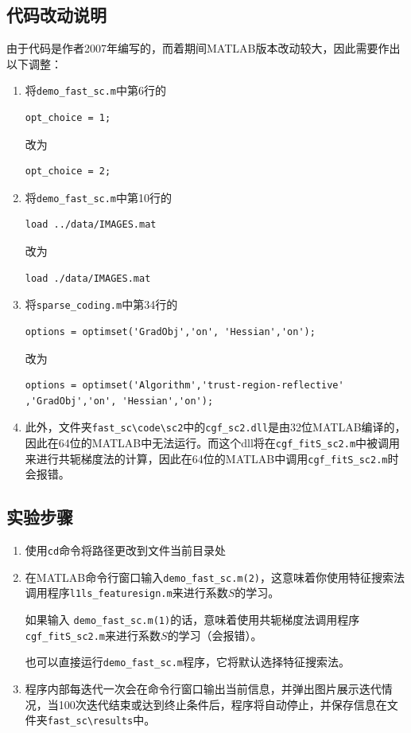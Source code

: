 \subsection*{代码改动说明}
由于代码是作者2007年编写的，而着期间MATLAB版本改动较大，因此需要作出以下调整：
\begin{enumerate}
  \item 将\texttt{demo\_fast\_sc.m}中第6行的
\begin{verbatim}
opt_choice = 1;
\end{verbatim}
改为
\begin{verbatim}
opt_choice = 2;
\end{verbatim}
  \item 将\texttt{demo\_fast\_sc.m}中第10行的
\begin{verbatim}
load ../data/IMAGES.mat
\end{verbatim}
改为
\begin{verbatim}
load ./data/IMAGES.mat
\end{verbatim}
  \item 将\texttt{sparse\_coding.m}中第34行的
\begin{verbatim}
options = optimset('GradObj','on', 'Hessian','on');
\end{verbatim}
改为
\begin{verbatim}
options = optimset('Algorithm','trust-region-reflective' ,'GradObj','on', 'Hessian','on');
\end{verbatim}



  \item 此外，文件夹\verb"fast_sc\code\sc2"中的\texttt{cgf\_sc2.dll}是由32位MATLAB编译的，因此在64位的MATLAB中无法运行。而这个dll将在\verb"cgf_fitS_sc2.m"中被调用来进行共轭梯度法的计算，因此在64位的MATLAB中调用\verb"cgf_fitS_sc2.m"时会报错。
\end{enumerate}

\subsection*{实验步骤}
\begin{enumerate}
\item 使用\verb"cd"命令将路径更改到文件当前目录处
\item 在MATLAB命令行窗口输入\texttt{demo_fast_sc.m(2)}，这意味着你使用特征搜索法调用程序\texttt{l1ls\_featuresign.m}来进行系数$S$的学习。

如果输入
\texttt{demo_fast_sc.m(1)}的话，意味着使用共轭梯度法调用程序\verb"cgf_fitS_sc2.m"来进行系数$S$的学习（会报错）。

也可以直接运行\verb"demo_fast_sc.m"程序，它将默认选择特征搜索法。

\item 程序内部每迭代一次会在命令行窗口输出当前信息，并弹出图片展示迭代情况，当100次迭代结束或达到终止条件后，程序将自动停止，并保存信息在文件夹\verb"fast_sc\results"中。
\end{enumerate}

